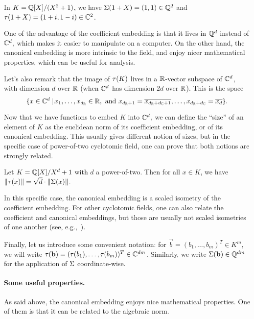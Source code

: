 \begin{example}
In $K = \mathbb{Q}[X]/(X^2+1)$, we have $\Sigma(1+X) = (1,1) \in \mathbb{Q}^2$ and $\tau(1+X) = (1+i, 1-i) \in \mathbb{C}^2$.
\end{example}

One of the advantage of the coefficient embedding is that it lives in $\mathbb{Q}^d$ instead of $\mathbb{C}^d$, which makes it easier to manipulate on a computer. On the other hand, the canonical embedding is more intrinsic to the field, and enjoy nicer mathematical properties, which can be useful for analysis.

Let's also remark that the image of $\tau(K)$ lives in a $\mathbb{R}$-vector subspace of $\mathbb{C}^d$, with dimension $d$ over $\mathbb{R}$ (when $\mathbb{C}^d$ has dimension $2d$ over $\mathbb{R}$). This is the space
\[\{x \in \mathbb{C}^d \,|\, x_1, \dots, x_{d_{\mathbb{R}}} \in \mathbb{R}, \text{ and } x_{d_{\mathbb{R}}+1} = \overline{x_{d_{\mathbb{R}}+d_{\mathbb{C}}+1}}, \dots, x_{d_{\mathbb{R}}+d_{\mathbb{C}}} = \overline{x_d} \}.\]

Now that we have functions to embed $K$ into $\mathbb{C}^d$, we can define the ``size'' of an element of $K$ as the euclidean norm of its coefficient embedding, or of its canonical embedding. This usually gives different notion of sizes, but in the specific case of power-of-two cyclotomic field, one can prove that both notions are strongly related.

\begin{proposition}
Let $K = \mathbb{Q}[X]/X^d+1$ with $d$ a power-of-two. Then for all $x \in K$, we have $\|\tau(x)\| = \sqrt{d} \cdot \|\Sigma(x)\|$.
\end{proposition}
In this specific case, the canonical embedding is a scaled isometry of the coefficient embedding. For other cyclotomic fields, one can also relate the coefficient and canonical embeddings, but those are usually not scaled isometries of one another (see, e.g.,~\cite{Blanco}).

Finally, let us introduce some convenient notation: for $\vec b = (b_1, \dots, b_m)^T \in K^m$, we will write $\tau(\mathbf b) = (\tau(b_1), \dots, \tau(b_m))^T \in \mathbb{C}^{dm}$. Similarly, we write $\Sigma(\mathbf b) \in \mathbb{Q}^{dm}$ for the application of $\Sigma$ coordinate-wise.

\paragraph{Some useful properties.} As said above, the canonical embedding enjoys nice mathematical properties. One of them is that it can be related to the algebraic norm.


